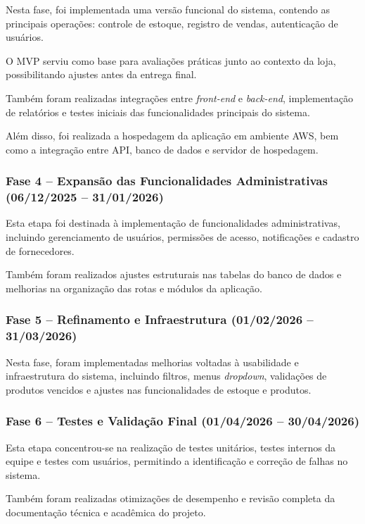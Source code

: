 Nesta fase, foi implementada uma versão funcional do sistema, contendo as principais operações: controle de estoque, registro de vendas, autenticação de usuários. 

O MVP serviu como base para avaliações práticas junto ao contexto da loja, possibilitando ajustes antes da entrega final.

Também foram realizadas integrações entre \textit{front-end} e \textit{back-end}, implementação de relatórios e testes iniciais das funcionalidades principais do sistema.

Além disso, foi realizada a hospedagem da aplicação em ambiente AWS, bem como a integração entre API, banco de dados e servidor de hospedagem.

\subsubsection{Fase 4 – Expansão das Funcionalidades Administrativas (06/12/2025 – 31/01/2026)}

Esta etapa foi destinada à implementação de funcionalidades administrativas, incluindo gerenciamento de usuários, permissões de acesso, notificações e cadastro de fornecedores.  

Também foram realizados ajustes estruturais nas tabelas do banco de dados e melhorias na organização das rotas e módulos da aplicação.  

\subsubsection{Fase 5 – Refinamento e Infraestrutura (01/02/2026 – 31/03/2026)}

Nesta fase, foram implementadas melhorias voltadas à usabilidade e infraestrutura do sistema, incluindo filtros, menus \textit{dropdown}, validações de produtos vencidos e ajustes nas funcionalidades de estoque e produtos.    

\subsubsection{Fase 6 – Testes e Validação Final (01/04/2026 – 30/04/2026)}

Esta etapa concentrou-se na realização de testes unitários, testes internos da equipe e testes com usuários, permitindo a identificação e correção de falhas no sistema.  

Também foram realizadas otimizações de desempenho e revisão completa da documentação técnica e acadêmica do projeto.  

